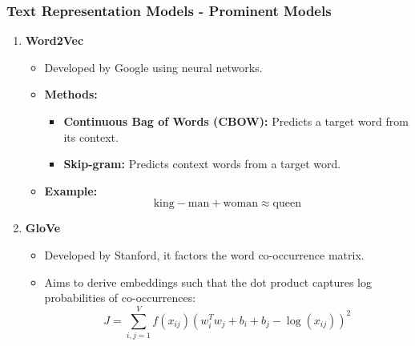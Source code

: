 \documentclass[aspectratio=169]{beamer}
\begin{document}
\begin{frame}[fragile]
    \frametitle{Text Representation Models - Prominent Models}
    \begin{enumerate}
        \item \textbf{Word2Vec}
            \begin{itemize}
                \item Developed by Google using neural networks.
                \item \textbf{Methods:}
                    \begin{itemize}
                        \item \textbf{Continuous Bag of Words (CBOW):} Predicts a target word from its context.
                        \item \textbf{Skip-gram:} Predicts context words from a target word.
                    \end{itemize}
                \item \textbf{Example:} 
                    \[
                    \text{king} - \text{man} + \text{woman} \approx \text{queen}
                    \]
            \end{itemize}
        
        \item \textbf{GloVe}
            \begin{itemize}
                \item Developed by Stanford, it factors the word co-occurrence matrix.
                \item Aims to derive embeddings such that the dot product captures log probabilities of co-occurrences:
                \[
                J = \sum_{i,j=1}^{V} f(x_{ij})(w_i^T w_j + b_i + b_j - \log(x_{ij}))^2
                \]
            \end{itemize}
    \end{enumerate}
\end{frame}
\end{document}

